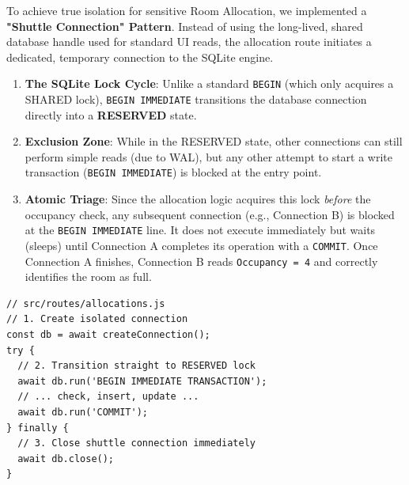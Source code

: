 \documentclass[sigconf]{acmart}
\begin{document}

To achieve true isolation for sensitive Room Allocation, we implemented a \textbf{"Shuttle Connection" Pattern}. Instead of using the long-lived, shared database handle used for standard UI reads, the allocation route initiates a dedicated, temporary connection to the SQLite engine.

\begin{enumerate}[leftmargin=*]
    \item \textbf{The SQLite Lock Cycle}: Unlike a standard \texttt{BEGIN} (which only acquires a SHARED lock), \texttt{BEGIN IMMEDIATE} transitions the database connection directly into a \textbf{RESERVED} state.
    \item \textbf{Exclusion Zone}: While in the RESERVED state, other connections can still perform simple reads (due to WAL), but any other attempt to start a write transaction (\texttt{BEGIN IMMEDIATE}) is blocked at the entry point.
    \item \textbf{Atomic Triage}: Since the allocation logic acquires this lock \textit{before} the occupancy check, any subsequent connection (e.g., Connection B) is blocked at the \texttt{BEGIN IMMEDIATE} line. It does not execute immediately but waits (sleeps) until Connection A completes its operation with a \texttt{COMMIT}. Once Connection A finishes, Connection B reads \texttt{Occupancy = 4} and correctly identifies the room as full.
\end{enumerate}

\begin{lstlisting}[style=jsstyle, caption={Shuttle connection and Reserved locking pattern}]
// src/routes/allocations.js
// 1. Create isolated connection
const db = await createConnection(); 
try {
  // 2. Transition straight to RESERVED lock
  await db.run('BEGIN IMMEDIATE TRANSACTION');
  // ... check, insert, update ...
  await db.run('COMMIT');
} finally {
  // 3. Close shuttle connection immediately
  await db.close(); 
}
\end{lstlisting}
\end{document}

